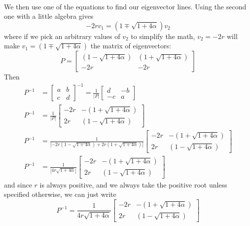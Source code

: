 \documentclass{article}
\begin{document}
\paragraph{}
We then use one of the equations to find our eigenvector lines. Using the second one with a little algebra gives
\[ -2rv_{1} = \left( 1 \mp \sqrt{1 + 4\alpha} \right) v_{2} \]
where if we pick an arbitrary values of $v_{2}$ to simplify the math, $v_{2}=-2r$ will make $v_{1} = \left( 1 \mp \sqrt{1 + 4\alpha} \right)$
the matrix of eigenvectors:
\[ P = 
\boxed{\begin{bmatrix}
\left( 1 - \sqrt{1 + 4\alpha} \right)	&	\left( 1 + \sqrt{1 + 4\alpha} \right)	\\
-2r										&	-2r	
\end{bmatrix}}
 \]
Then 
\begin{align*}
P^{-1} &= 
\begin{bmatrix}
a&b\\
c&d
\end{bmatrix}^{-1}
=
\frac{1}{|P|}
\begin{bmatrix}
d	&	-b\\
-c	&	a
\end{bmatrix}\\
P^{-1} &= \frac{1}{|P|}
\begin{bmatrix}
-2r	&	-\left( 1 + \sqrt{1 + 4\alpha} \right)	\\
2r	&	\left( 1 - \sqrt{1 + 4\alpha} \right)	
\end{bmatrix}
\\
P^{-1} &= \frac{1}{\left| -2r\left( 1 - \sqrt{1 + 4\alpha} \right) +2r\left( 1 + \sqrt{1 + 4\alpha} \right) \right|}
\begin{bmatrix}
-2r	&	-\left( 1 + \sqrt{1 + 4\alpha} \right)	\\
2r	&	\left( 1 - \sqrt{1 + 4\alpha} \right)	
\end{bmatrix}
\\
P^{-1} &= \frac{1}{\left| 4r\sqrt{1 + 4\alpha} \right|}
\begin{bmatrix}
-2r	&	-\left( 1 + \sqrt{1 + 4\alpha} \right)	\\
2r	&	\left( 1 - \sqrt{1 + 4\alpha} \right)	
\end{bmatrix}
\end{align*}
and since $r$ is always positive, and we always take the positive root unless specified otherwise, we can just write
\[ P^{-1} = \boxed{\frac{1}{ 4r\sqrt{1 + 4\alpha} }
\begin{bmatrix}
-2r	&	-\left( 1 + \sqrt{1 + 4\alpha} \right)	\\
2r	&	\left( 1 - \sqrt{1 + 4\alpha} \right)	
\end{bmatrix}} \]
\end{document}
